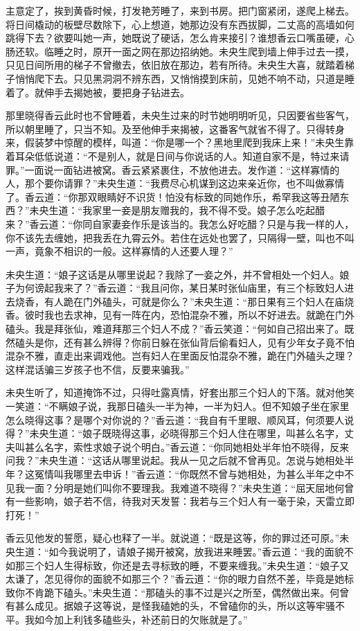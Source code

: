 \documentclass[a4paper,12pt,UTF8,twoside]{ctexbook}
\begin{document}
主意定了，挨到黄昏时候，打发艳芳睡了，来到书房。把门窗紧闭，遂爬上梯去。将日间橇动的板壁尽数除下，心上想道，她那边没有东西拔脚，二丈高的高墙如何跳得下去？欲要叫她一声，她既说了硬话，怎么肯来接引？谁想香云口嘴虽硬，心肠还软。临睡之时，原开一面之网在那边招纳她。未央生爬到墙上伸手过去一摸，只见日间所用的梯子不曾撤去，依旧放在那边，若有所待。未央生大喜，就踏着梯子悄悄爬下去。只见黑洞洞不辨东西，又悄悄摸到床前，见她不响不动，只道是睡着了。就伸手去揭她被，要把身子钻进去。

那里晓得香云此时也不曾睡着，未央生过来的时节她明明听见，只因要省些客气，所以朝里睡了，只当不知。及至他伸手来揭被，这番客气就省不得了。只得转身来，假装梦中惊醒的模样，叫道：“你是哪一个？黑地里爬到我床上来！”未央生靠着耳朵低低说道：“不是别人，就是日间与你说话的人。知道自家不是，特过来请罪。”一面说一面钻进被窝。香云紧紧裹住，不放他进去。发作道：“这样寡情的人，那个要你请罪？”未央生道：“我费尽心机谋到这边来亲近你，也不叫做寡情了。香云道：“你那双眼睛好不识货！怕没有标致的同她作乐，希罕我这等丑陋东西？”未央生道：“我家里一妾是朋友赠我的，我不得不受。娘子怎么吃起醋来？”香云道：“你同自家妻妾作乐是该当的。我怎么好吃醋？只是与我一样的人，你不该先去缠她，把我丢在九霄云外。若住在远处也罢了，只隔得一壁，叫也不叫一声，竟象不相识的一般。这样寡情的人还要人理？”

未央生道：“娘子这话是从哪里说起？我除了一妾之外，并不曾相处一个妇人。娘子为何谤起我来了？”香云道：“我且问你，某日某时张仙庙里，有三个标致妇人进去烧香，有人跪在门外磕头，可就是你么？”未央生道：“那日果有三个妇人在庙烧香。彼时我也去求神，见有一阵在内，恐怕混杂不雅，所以不好进去。就跪在门外磕头。我是拜张仙，难道拜那三个妇人不成？”香云笑道：“何如自己招出来了。既然磕头是你，还有甚么辨得？你前日躲在张仙背后偷看妇人，见有少年女子竟不怕混杂不雅，直走出来调戏他。岂有妇人在里面反怕混杂不雅，跪在门外磕头之理？这样混话骗三岁孩子也不信，反要来骗我。”

未央生听了，知道掩饰不过，只得吐露真情，好套出那三个妇人的下落。就对他笑一笑道：“不瞒娘子说，我那日磕头一半为神，一半为妇人。但不知娘子坐在家里怎么晓得这事？是哪个对你说的？”香云道：“我自有千里眼、顺风耳，何须要人说得？”未央生道：“娘子既晓得这事，必晓得那三个妇人住在哪里，叫甚么名字，丈夫叫甚么名字，索性求娘子说个明白。”香云道：“你同她相处半年怕不晓得，反来问我？”未央生道：“这话从哪里说起。我从一见之后就不曾再见。怎说与她相处半年？这冤情叫我哪里去申诉！”香云道：“你既然不曾与她相处，为甚么半年之中不见我一面？分明是她们叫你不要理我。我难道不晓得？”未央生道：“屈天屈地何曾有一些影响，娘子若不信，待我对天发誓：我若与三个妇人有一毫于染，天雷立即打死！”

香云见他发的誓愿，疑心也释了一半。就说道：“既是这等，你的罪过还可原。”未央生道：“如今我说明了，请娘子揭开被窝，放我进来睡罢。”香云道：“我的面貌不如那三个妇人生得标致，你还是去寻标致的睡，不要来缠我。”未央生道：“娘子又太谦了，怎见得你的面貌不如那三个？”香云道：“你的眼力自然不差，毕竟是她标致你不肯跪下磕头。”未央生道：“那磕头的事不过是兴之所至，偶然做出来。何曾有甚么成见。据娘子这等说，是怪我磕她的头，不曾磕你的头，所以这等牢骚不平。我如今加上利钱多磕些头，补还前日的欠账就是了。”
\end{document}
